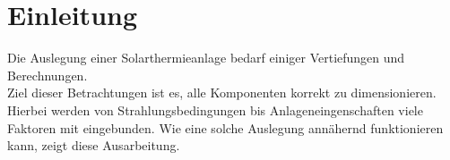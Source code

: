\section{Einleitung}
\label{sec:Einleitung}
Die Auslegung einer Solarthermieanlage bedarf einiger Vertiefungen und Berechnungen.\\
Ziel dieser Betrachtungen ist es, alle Komponenten korrekt zu dimensionieren.
Hierbei werden von Strahlungsbedingungen bis Anlageneingenschaften viele Faktoren mit eingebunden.
Wie eine solche Auslegung annähernd funktionieren kann, zeigt diese Ausarbeitung.

